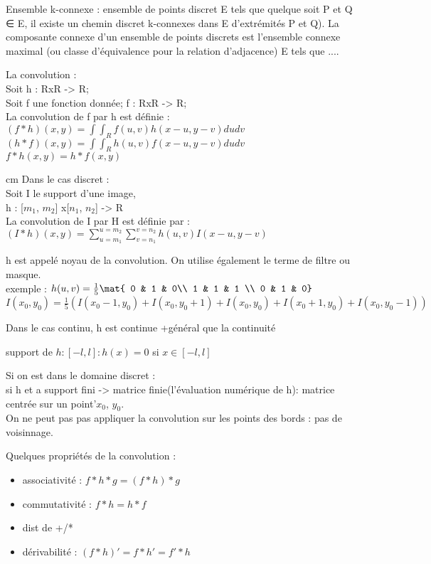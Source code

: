 \documentclass[11pt]{cours}
\begin{document}
Ensemble k-connexe : ensemble de points discret E tels que quelque soit P et Q ∈ E, il existe un chemin discret k-connexes dans E d'extrémités P et Q). La composante connexe d'un ensemble de points discrets est l'ensemble connexe maximal (ou classe d'équivalence pour la relation d'adjacence) E tels que ....
\vskip 1cm

La convolution : \\
Soit h : RxR -> R;\\
Soit f une fonction donnée; f : RxR -> R;\\
La convolution de f par h est définie : \\
$(f * h)(x, y) = \int \int_R f(u, v)h(x-u, y - v) dudv$\\
$(h * f)(x, y) = \int \int_R h(u,v)f(x - u, y -v ) du dv$\\
$f * h(x, y) = h * f(x, y)$

 cm
Dans le cas discret :\\
Soit I le support d'une image, \\
h : [$m_1$, $m_2$] x[$n_1$, $n_2$] -> R\\

La convolution de I par H est définie par :\\
$(I * h)(x, y) = \sum^{u=m_2}_{u=m_1}\sum^{v=n_2}_{v=n_1} h(u, v)I(x- u, y-v)$

h est appelé noyau de la convolution. On utilise également le terme de filtre ou masque.\\


exemple :
$h(u, v) = \frac{1}{5}\mat { 0 & 1 & 0\\ 1 & 1 & 1 \\ 0 & 1 & 0}$\\
$I(x_0, y_0) = \frac{1}{5}(
I(x_0 -1, y_0) + I(x_0, y_0+1) + I(x_0, y_0) + I(x_0 +1, y_0) + I(x_0, y_0 -1))$

Dans le cas continu, h est continue {+général que la continuité}

support de $h : [-l, l] : h(x) = 0$ si $x \in [-l, l]$

\vskip 1cm

Si on est dans le domaine discret :\\
si h et a support fini -> matrice finie(l'évaluation numérique de h): matrice centrée sur un point'$x_0$, $y_0$.\\
On ne peut pas pas appliquer la convolution sur les points des bords : pas de voisinnage.


Quelques propriétés de la convolution :
\begin{itemize}
	\item associativité : $f * h * g =(f*h) *g$
	\item commutativité : $f* h = h * f$
	\item dist de +/*
	\item dérivabilité : $(f *h)' = f * h' = f' * h$
\end{itemize}
\end{document}
